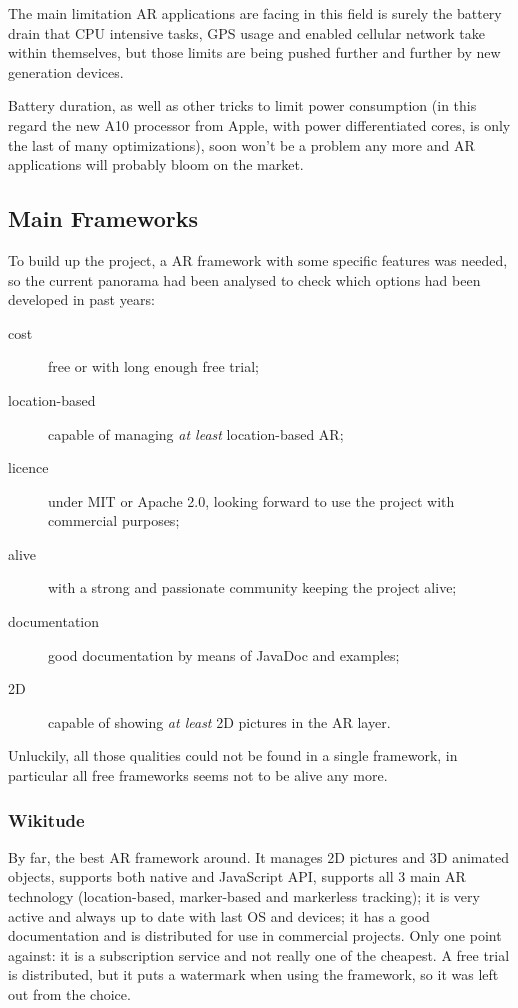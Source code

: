		The main limitation AR applications are facing in this field is surely the battery drain that CPU intensive tasks, GPS usage and enabled cellular network take within themselves, but those limits are being pushed further and further by new generation devices.
		
		Battery duration, as well as other tricks to limit power consumption (in this regard the new A10 processor from Apple, with power differentiated cores, is only the last of many optimizations), soon won't be a problem any more and AR applications will probably bloom on the market.
		
		\subsection{Main Frameworks}
			
			To build up the project, a AR framework with some specific features was needed, so the current panorama had been analysed to check which options had been developed in past years:
			
			\begin{description}
				\item[cost] free or with long enough free trial;
				\item[location-based] capable of managing \emph{at least} location-based AR;
				\item[licence] under MIT or Apache 2.0, looking forward to use the project with commercial purposes;
				\item[alive] with a strong and passionate community keeping the project alive;
				\item[documentation] good documentation by means of JavaDoc and examples;
				\item[2D] capable of showing \emph{at least} 2D pictures in the AR layer.
			\end{description}
			
			Unluckily, all those qualities could not be found in a single framework, in particular all free frameworks seems not to be alive any more.
			
			\subsubsection{Wikitude}
			
				By far, the best AR framework around. It manages 2D pictures and 3D animated objects, supports both native and JavaScript API, supports all 3 main AR technology (location-based, marker-based and markerless tracking); it is very active and always up to date with last OS and devices; it has a good documentation and is distributed for use in commercial projects.
				Only one point against: it is a subscription service and not really one of the cheapest.
				A free trial is distributed, but it puts a watermark when using the framework, so it was left out from the choice.
			
